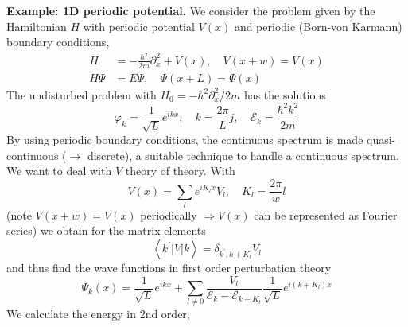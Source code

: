 \textbf{Example: 1D periodic potential.} We consider the problem given by the Hamiltonian $H$ with periodic potential $V (x)$ and periodic (Born-von Karmann) boundary conditions,
\begin{equation}
\begin{aligned} H &=-\frac{\hbar^{2}}{2 m} \partial_{x}^{2}+V(x), \quad V(x+w)=V(x) \\ H \Psi &=E \Psi, \quad \Psi(x+L)=\Psi(x) \end{aligned}
\end{equation}
The undisturbed problem with $H_0 = -\hbar^2\partial_x^2 / 2m$ has the solutions
\begin{equation}
    \varphi_{k}=\frac{1}{\sqrt{L}} e^{i k x}, \quad k=\frac{2 \pi}{L} j, \quad \mathcal{E}_{k}=\frac{\hbar^{2} k^{2}}{2 m}
    \end{equation}
By using periodic boundary conditions, the continuous spectrum is made quasi-continuous ($\rightarrow$ discrete), a suitable technique to handle a continuous spectrum. We want to deal with $V$ theory of theory. With
\begin{equation}
    V(x)=\sum_{l} e^{i K_{l} x} V_{l}, \quad K_{l}=\frac{2 \pi}{w} l
    \end{equation}
(note $V (x + w) = V (x)$ periodically $\Rightarrow V (x)$ can be represented as Fourier series) we obtain for the matrix elements
\begin{equation}
    \left\langle k^{\prime}|V| k\right\rangle=\delta_{k^{\prime}, k+K_{l}} V_{l}
    \end{equation}
and thus find the wave functions in first order perturbation theory
\begin{equation}
    \Psi_{k}(x)=\frac{1}{\sqrt{L}} e^{i k x}+\sum_{l \neq 0} \frac{V_{l}}{\mathcal{E}_{k}-\mathcal{E}_{k+K_{l}}} \frac{1}{\sqrt{L}} e^{i\left(k+K_{l}\right) x}
    \end{equation}
We calculate the energy in 2nd order,

